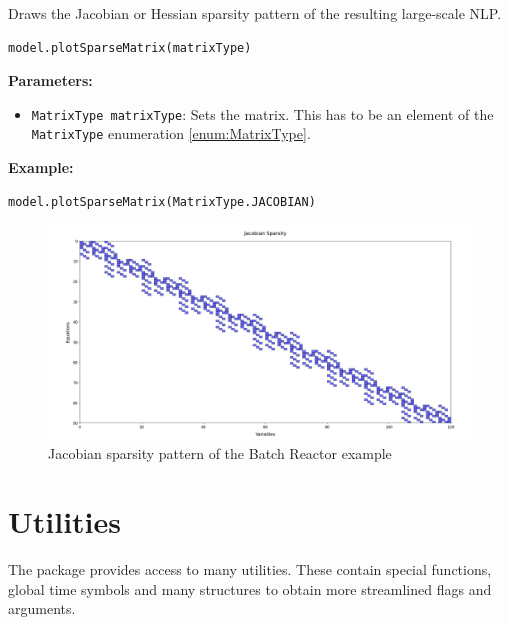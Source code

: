 \documentclass[12pt]{article}
\begin{document}
\begin{mdframed}[backgroundcolor=gray!10, roundcorner=10pt,
		linewidth=1pt]
	
	Draws the Jacobian or Hessian sparsity pattern of the resulting large-scale NLP.
 
	\begin{lstlisting}
model.plotSparseMatrix(matrixType)
		\end{lstlisting}
	\label{plotSparseMatrix}
	\textbf{Parameters:}
	\begin{itemize}
		\item \texttt{MatrixType matrixType}: Sets the matrix. This has to be an element of the \texttt{MatrixType} enumeration \eqref{enum:MatrixType}.
	\end{itemize}
	
	\textbf{Example:}
\begin{lstlisting}
model.plotSparseMatrix(MatrixType.JACOBIAN)   
\end{lstlisting}
\begin{figure}[H]
	\centering
	\includegraphics[width=1\textwidth]{images/sparse.png}
	\caption{Jacobian sparsity pattern of the Batch Reactor example}
	\label{fig:sparseBatch}
\end{figure}
\end{mdframed}

\section{Utilities}
The package provides access to many utilities.
These contain special functions, global time symbols and many structures to
obtain more streamlined flags and arguments.
\end{document}
